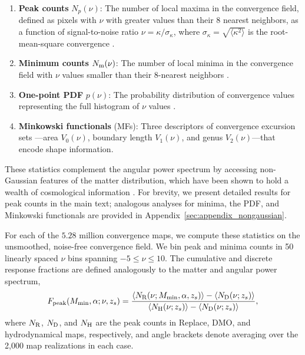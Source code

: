 \documentclass[linenumbers,trackchanges]{aastex701}
\begin{document}
\begin{enumerate}
\item \textbf{Peak counts} $N_p(\nu)$: The number of local maxima in the convergence field, defined as pixels with $\nu$ with greater values than their $8$ nearest neighbors, as a function of signal-to-noise ratio $\nu = \kappa/\sigma_\kappa$, where $\sigma_\kappa = \sqrt{\langle \kappa^2 \rangle}$ is the root-mean-square convergence \citep{}.
\item \textbf{Minimum counts} $N_{\rm m}(\nu)$: The number of local minima in the convergence field with $\nu$ values smaller than their $8$-nearest neighbors \citep{}.
\item \textbf{One-point PDF} $p(\nu)$: The probability distribution of convergence values representing the full histogram of $\nu$ values \citep{}.
\item \textbf{Minkowski functionals} (MFs): Three descriptors of convergence excursion sets \citep{}—area $V_0(\nu)$, boundary length $V_1(\nu)$, and genus $V_2(\nu)$—that encode shape information.
\end{enumerate}

These statistics complement the angular power spectrum by accessing non-Gaussian features of the matter distribution, which have been shown to hold a wealth of cosmological information \cite{}. For brevity, we present detailed results for peak counts in the main text; analogous analyses for minima, the PDF, and Minkowski functionals are provided in Appendix~\ref{sec:appendix_nongaussian}.

For each of the $5.28$ million convergence maps, we compute these statistics on the unsmoothed, noise-free convergence field. We bin peak and minima counts in 50 linearly spaced $\nu$ bins spanning $-5 \leq \nu \leq 10$. The cumulative and discrete response fractions are defined analogously to the matter and angular power spectrum,
\begin{equation}
\label{eq:F_peak}
F_{\rm peak}(M_{\min}, \alpha; \nu, z_s) = \frac{\langle N_{\rm R}(\nu; M_{\min}, \alpha, z_s) \rangle - \langle N_{\rm D}(\nu; z_s) \rangle}{\langle N_{\rm H}(\nu; z_s) \rangle - \langle N_{\rm D}(\nu; z_s) \rangle},
\end{equation}
where $N_{\rm R}$, $N_{\rm D}$, and $N_{\rm H}$ are the peak counts in Replace, DMO, and hydrodynamical maps, respectively, and angle brackets denote averaging over the 2,000 map realizations in each case.
\end{document}
